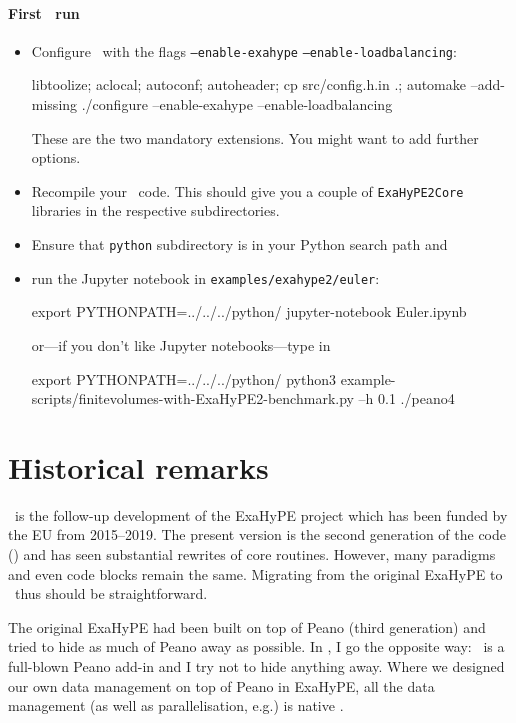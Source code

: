 \begin{framed}
\paragraph*{First \ExaHyPE\ run}
\begin{itemize}
  \item Configure \Peano\ with the flags \texttt{--enable-exahype}
  \texttt{--enable-loadbalancing}:
  \begin{code}
libtoolize; aclocal; autoconf; autoheader; cp src/config.h.in .; automake --add-missing
./configure --enable-exahype --enable-loadbalancing
  \end{code}
   These are the two mandatory extensions. You might want to add further options.
  \item Recompile your \Peano\ code. This should give you a couple of
  \texttt{ExaHyPE2Core} libraries in the respective subdirectories.
  \item Ensure that \texttt{python} subdirectory is in your Python search path
  and
  \item run the Jupyter notebook in \texttt{examples/exahype2/euler}: 
  \begin{code}
export PYTHONPATH=../../../python/
jupyter-notebook Euler.ipynb
  \end{code}
  \noindent
  or---if you don't like Jupyter notebooks---type in
  \begin{code}
export PYTHONPATH=../../../python/
python3 example-scripts/finitevolumes-with-ExaHyPE2-benchmark.py --h 0.1
./peano4
  \end{code}
\end{itemize}
\end{framed}



\section{Historical remarks}

\ExaHyPE\ is the follow-up development of the ExaHyPE project which has
been funded by the EU from 2015--2019.
The present version is the second generation of the code (\ExaHyPE) and has
seen substantial rewrites of core routines.
However, many paradigms and even code blocks remain the same.
Migrating from the original ExaHyPE to \ExaHyPE\ thus should be straightforward.


The original ExaHyPE had been built on top of Peano (third generation) and tried
to hide as much of Peano away as possible.
In \ExaHyPE, I go the opposite way: \ExaHyPE\ is a full-blown Peano add-in and I
try not to hide anything away.
Where we designed our own data management on top of Peano in ExaHyPE, all the
data management (as well as parallelisation, e.g.) is native \Peano.


